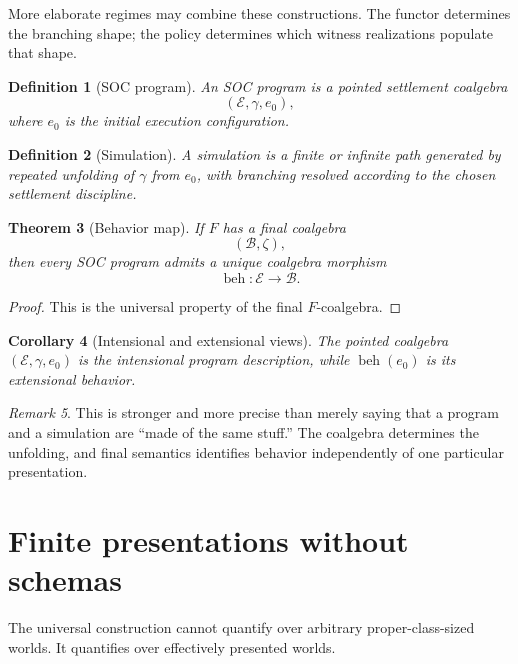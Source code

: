 \documentclass[11pt]{article}
\newtheorem{definition}{Definition}[section]
\newtheorem{theorem}[definition]{Theorem}
\newtheorem{corollary}[definition]{Corollary}
\theoremstyle{remark}
\newtheorem{remark}[definition]{Remark}
\newcommand{\Exec}{\mathcal{E}}
\newcommand{\Beh}{\mathcal{B}}
\newcommand{\beh}{\operatorname{beh}}
\begin{document}
More elaborate regimes may combine these constructions. The functor determines
the branching shape; the policy determines which witness realizations populate
that shape.

\begin{definition}[SOC program]
An SOC program is a pointed settlement coalgebra
\[
  (\Exec,\gamma,e_0),
\]
where $e_0$ is the initial execution configuration.
\end{definition}

\begin{definition}[Simulation]
A simulation is a finite or infinite path generated by repeated unfolding of
$\gamma$ from $e_0$, with branching resolved according to the chosen
settlement discipline.
\end{definition}

\begin{theorem}[Behavior map]
If $F$ has a final coalgebra
\[
  (\Beh,\zeta),
\]
then every SOC program admits a unique coalgebra morphism
\[
  \beh:\Exec\longrightarrow\Beh.
\]
\end{theorem}

\begin{proof}
This is the universal property of the final $F$-coalgebra.
\end{proof}

\begin{corollary}[Intensional and extensional views]
The pointed coalgebra $(\Exec,\gamma,e_0)$ is the intensional program
description, while $\beh(e_0)$ is its extensional behavior.
\end{corollary}

\begin{remark}
This is stronger and more precise than merely saying that a program and a
simulation are ``made of the same stuff.'' The coalgebra determines the
unfolding, and final semantics identifies behavior independently of one
particular presentation.
\end{remark}

\section{Finite presentations without schemas}

The universal construction cannot quantify over arbitrary proper-class-sized
worlds. It quantifies over effectively presented worlds.
\end{document}
